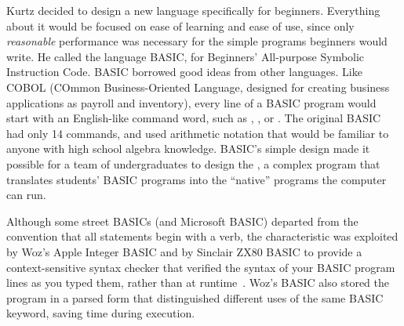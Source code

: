 Kurtz decided to design a new language specifically for beginners.
Everything about it would be focused on ease of learning and ease of
use, since only \emph{reasonable} performance was necessary for the
simple programs beginners would write.
He called the language BASIC, for Beginners' All-purpose Symbolic
Instruction Code.
BASIC borrowed good ideas from other languages.
Like COBOL (COmmon Business-Oriented Language, designed for creating
business applications as payroll and inventory), every line of a BASIC
program would start with an English-like command word, such as
, , or .
The original BASIC had only 14 commands, and used arithmetic notation
that would be familiar to anyone with high school algebra knowledge.
BASIC's simple
design made it possible for a team of undergraduates to design the
, a complex program that translates students' BASIC programs
into the ``native'' programs the computer can run.

  \begin{geeknote}
   Although some street BASICs (and Microsoft BASIC) departed from the
   convention that all statements begin with a verb, 
   the characteristic was exploited by Woz's Apple Integer BASIC and by
   Sinclair ZX80 BASIC to 
    provide a context-sensitive syntax checker that verified the syntax
    of your BASIC program lines as you typed them, rather than at
    runtime~\cite{zx80_basic_techreport}.  Woz's BASIC also stored the
    program in a parsed form that distinguished different uses of the
    same BASIC keyword, saving time during execution.
  \end{geeknote}

